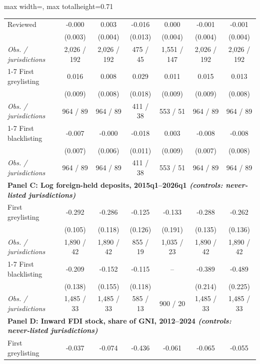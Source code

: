 \begin{table}[p]
{\begin{adjustbox}{max width=\textwidth, max totalheight=0.71\textheight}
\begin{tabular}{l*{6}{c}}
Reviewed & -0.000 & 0.003 & -0.016 & 0.000 & -0.001 & -0.001 \\
 & (0.003) & (0.004) & (0.013) & (0.004) & (0.004) & (0.004) \\
\hspace{1em}\textit{Obs. / jurisdictions} & 2,026 / 192 & 2,026 / 192 & 475 / 45 & 1,551 / 147 & 2,026 / 192 & 2,026 / 192 \\
\cmidrule(lr){1-7}
First greylisting & 0.016\sym{*} & 0.008 & 0.029 & 0.011 & 0.015\sym{*} & 0.013 \\
 & (0.009) & (0.008) & (0.018) & (0.009) & (0.009) & (0.008) \\
\hspace{1em}\textit{Obs. / jurisdictions} & 964 / 89 & 964 / 89 & 411 / 38 & 553 / 51 & 964 / 89 & 964 / 89 \\
\cmidrule(lr){1-7}
First blacklisting & -0.007 & -0.000 & -0.018 & 0.003 & -0.008 & -0.008 \\
 & (0.007) & (0.006) & (0.011) & (0.009) & (0.007) & (0.008) \\
\hspace{1em}\textit{Obs. / jurisdictions} & 964 / 89 & 964 / 89 & 411 / 38 & 553 / 51 & 964 / 89 & 964 / 89 \\
\midrule
\multicolumn{7}{l}{\textbf{Panel C: Log foreign-held deposits, 2015q1--2026q1 \normalfont\emph{(controls: never-listed jurisdictions)}}} \\[2pt]
First greylisting & -0.292\sym{***} & -0.286\sym{**} & -0.125 & -0.133 & -0.288\sym{**} & -0.262\sym{*} \\
 & (0.105) & (0.118) & (0.126) & (0.191) & (0.135) & (0.136) \\
\hspace{1em}\textit{Obs. / jurisdictions} & 1,890 / 42 & 1,890 / 42 & 855 / 19 & 1,035 / 23 & 1,890 / 42 & 1,890 / 42 \\
\cmidrule(lr){1-7}
First blacklisting & -0.209 & -0.152 & -0.115 & -- & -0.389\sym{*} & -0.489\sym{**} \\
 & (0.138) & (0.155) & (0.118) &  & (0.214) & (0.225) \\
\hspace{1em}\textit{Obs. / jurisdictions} & 1,485 / 33 & 1,485 / 33 & 585 / 13 & 900 / 20 & 1,485 / 33 & 1,485 / 33 \\
\midrule
\multicolumn{7}{l}{\textbf{Panel D: Inward FDI stock, share of GNI, 2012--2024 \normalfont\emph{(controls: never-listed jurisdictions)}}} \\[2pt]
First greylisting & -0.037 & -0.074 & -0.436 & -0.061 & -0.065 & -0.055 \\

\end{tabular}
\end{adjustbox}}
\end{table}
